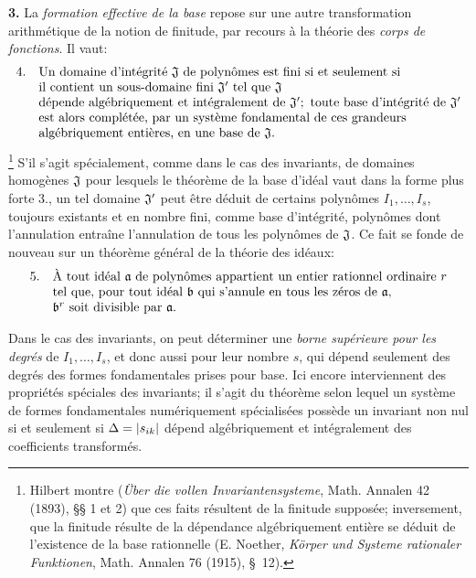 \textbf{3.} La \emph{formation effective de la base} repose sur une autre transformation arithmétique de la notion de finitude, par recours à la théorie des \emph{corps de fonctions}. Il vaut:
\[
\begin{array}{ll}
4.& \text{Un domaine d’intégrité }\mathfrak{J}\text{ de polynômes est fini si et seulement si}\\
& \text{il contient un sous-domaine fini }\mathfrak{J}'\text{ tel que }\mathfrak{J}\\
& \text{dépende algébriquement et intégralement de }\mathfrak{J}';\text{ toute base d'intégrité de }\mathfrak{J}'\\
& \text{est alors complétée, par un système fondamental de ces grandeurs}\\
& \text{algébriquement entières, en une base de }\mathfrak{J}.
\end{array}
\]
\footnote{Hilbert montre (\emph{Über die vollen Invariantensysteme}, Math. Annalen 42 (1893), \S\S{} 1 et 2) que ces faits résultent de la finitude supposée; inversement, que la finitude résulte de la dépendance algébriquement entière se déduit de l'existence de la base rationnelle (E. Noether, \emph{Körper und Systeme rationaler Funktionen}, Math. Annalen 76 (1915), \S\ 12).}
S'il s'agit spécialement, comme dans le cas des invariants, de domaines homogènes $\mathfrak{J}$ pour lesquels le théorème de la base d'idéal vaut dans la forme plus forte 3., un tel domaine $\mathfrak{J}'$ peut être déduit de certains polynômes $I_1,\ldots,I_s$, toujours existants et en nombre fini, comme base d'intégrité, polynômes dont l'annulation entraîne l'annulation de tous les polynômes de $\mathfrak{J}$. Ce fait se fonde de nouveau sur un théorème général de la théorie des idéaux:
\[
\begin{array}{ll}
5.& \text{À tout idéal }\mathfrak{a}\text{ de polynômes appartient un entier rationnel ordinaire }r\\
& \text{tel que, pour tout idéal }\mathfrak{b}\text{ qui s'annule en tous les zéros de }\mathfrak{a},\\
& \mathfrak{b}^r\text{ soit divisible par }\mathfrak{a}.
\end{array}
\]

Dans le cas des invariants, on peut déterminer une \emph{borne supérieure pour les degrés} de $I_1,\ldots,I_s$, et donc aussi pour leur nombre $s$, qui dépend seulement des degrés des formes fondamentales prises pour base. Ici encore interviennent des propriétés spéciales des invariants; il s'agit du théorème selon lequel un système de formes fondamentales numériquement spécialisées possède un invariant non nul si et seulement si $\Delta=|s_{ik}|$ dépend algébriquement et intégralement des coefficients transformés.

